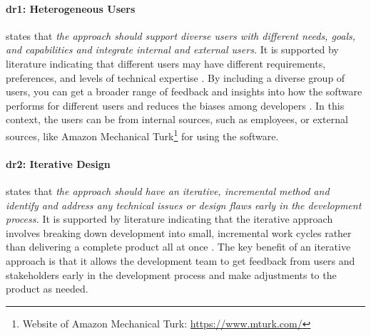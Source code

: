 
\paragraph{\ac{dr}1: Heterogeneous Users} states that \textit{the approach should support diverse users with different needs, goals, and capabilities and integrate internal and external users.} 
It is supported by literature indicating that different users may have different requirements, preferences, and levels of technical expertise \cite{misc:lean:steve}.
By including a diverse group of users, you can get a broader range of feedback and insights into how the software performs for different users \cite{article:prototyping:weichbroth} and reduces the biases among developers \cite{misc:lean:burmeister}.
In this context, the users can be from internal sources, such as employees, or external sources, like Amazon Mechanical Turk\footnote{Website of Amazon Mechanical Turk: \url{https://www.mturk.com/}} for using the software.

\paragraph{\ac{dr}2: Iterative Design} states that \textit{the approach should have an iterative, incremental method and identify and address any technical issues or design flaws early in the development process.} 
It is supported by literature indicating that the iterative approach involves breaking down development into small, incremental work cycles rather than delivering a complete product all at once \cite{misc:lean:tutorial}.
The key benefit of an iterative approach is that it allows the development team to get feedback from users and stakeholders early in the development process and make adjustments \cite{article:experiments:lindgren} to the product as needed.

